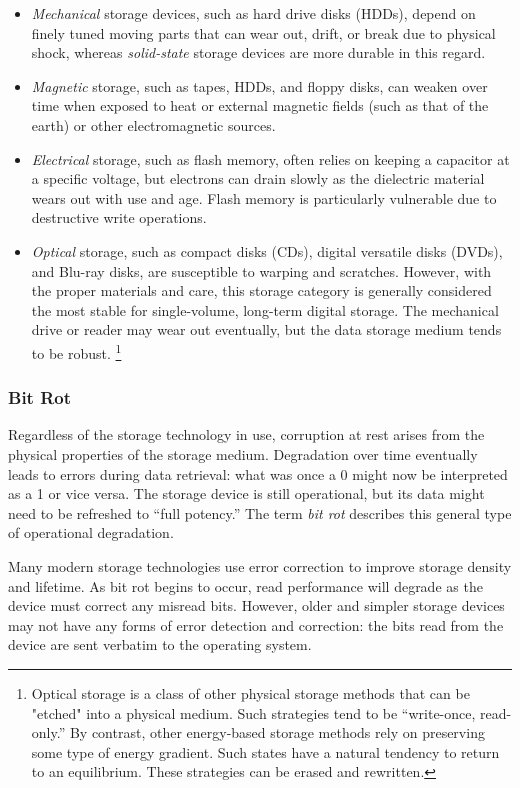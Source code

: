\begin{itemize}
    \item \emph{Mechanical} storage devices, such as hard drive disks (HDDs), depend on finely tuned moving parts that can wear out, drift, or break due to physical shock, whereas \emph{solid-state} storage devices are more durable in this regard.
    \item \emph{Magnetic} storage, such as tapes, HDDs, and floppy disks, can weaken over time when exposed to heat or external magnetic fields (such as that of the earth) or other electromagnetic sources.
    \item \emph{Electrical} storage, such as flash memory, often relies on keeping a capacitor at a specific voltage, but electrons can drain slowly as the dielectric material wears out with use and age. Flash memory is particularly vulnerable due to destructive write operations.
    \item \emph{Optical} storage, such as compact disks (CDs), digital versatile disks (DVDs), and Blu-ray disks, are susceptible to warping and scratches. However, with the proper materials and care, this storage category is generally considered the most stable for single-volume, long-term digital storage. The mechanical drive or reader may wear out eventually, but the data storage medium tends to be robust. \footnote{Optical storage is a class of other physical storage methods that can be "etched" into a physical medium. Such strategies tend to be ``write-once, read-only.'' By contrast, other energy-based storage methods rely on preserving some type of energy gradient. Such states have a natural tendency to return to an equilibrium. These strategies can be erased and rewritten.}
\end{itemize}

\subsubsection{Bit Rot}

Regardless of the storage technology in use, corruption at rest arises from the physical properties of the storage medium. Degradation over time eventually leads to errors during data retrieval: what was once a 0 might now be interpreted as a 1 or vice versa. The storage device is still operational, but its data might need to be refreshed to ``full potency.'' The term \emph{bit rot} describes this general type of operational degradation. \cite{gibson1993}

Many modern storage technologies use error correction to improve storage density and lifetime. As bit rot begins to occur, read performance will degrade as the device must correct any misread bits. However, older and simpler storage devices may not have any forms of error detection and correction: the bits read from the device are sent verbatim to the operating system.

